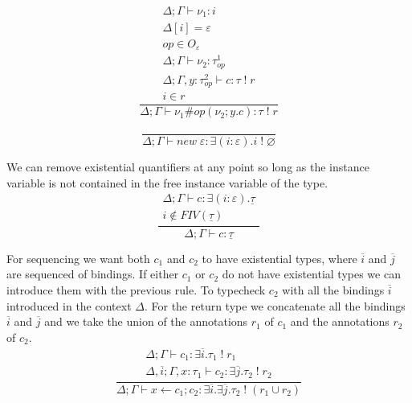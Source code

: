 \documentclass[12pt]{article}
\newcommand\eff[0]{\varepsilon}
\newcommand\Op[0]{O}
\newcommand\op[0]{op}
\newcommand\pty[1]{\ty^1_{#1}}
\newcommand\rty[1]{\ty^2_{#1}}
\newcommand\ty[0]{\tau}
\newcommand\cty[0]{\underline{\ty}}
\newcommand\aty[2]{#1 \; ! \; #2}
\newcommand\texists[3]{\exists(#1:#2) . #3}
\newcommand\texistss[2]{\exists \overline{#1} . #2}
\newcommand\val[0]{\nu}
\newcommand\comp[0]{c}
\newcommand\cdo[3]{#1 \leftarrow #2 ; #3}
\newcommand\copi[5]{#1 \# #2(#3 ; #4 . #5)}
\newcommand\cnew[1]{\textit{new} \; #1}
\begin{document}
\begin{minipage}{0.5\textwidth}
\[\frac{
	\begin{array}{l}
	\Delta;\Gamma \vdash \val_1 : i \\
	\Delta[i] = \eff \\
	\op \in \Op_\eff\\
	\Delta;\Gamma \vdash \val_2 : \pty{\op} \\
	\Delta;\Gamma , y : \rty{\op} \vdash \comp : \aty{\ty}{r} \\
	i \in r
	\end{array}
}{
	\Delta;\Gamma \vdash \copi{\val_1}{\op}{\val_2}{y}{\comp} : \aty{\ty}{r}
}\]
\vspace{10pt}
\end{minipage}
\begin{minipage}{0.5\textwidth}
\[\frac{
}{
	\Delta;\Gamma \vdash \cnew{\eff} : \texists{i}{\eff}{\aty{i}{\varnothing}}
}\]
\vspace{10pt}
\end{minipage}

We can remove existential quantifiers at any point so long as the instance variable is not contained in the free instance variable of the type. \\
\[\frac{
	\begin{array}{l}
	\Delta;\Gamma \vdash c : \texists{i}{\eff}{\cty} \\
	i \notin FIV(\cty)
	\end{array}
}{
	\Delta;\Gamma \vdash c : \cty
}\]

\newpage

For sequencing we want both $c_1$ and $c_2$ to have existential types, where $\overline{i}$ and $\overline{j}$ are sequenced of bindings. If either $c_1$ or $c_2$ do not have existential types we can introduce them with the previous rule.
To typecheck $c_2$ with all the bindings $\overline{i}$ introduced in the context $\Delta$. For the return type we concatenate all the bindings $\overline{i}$ and $\overline{j}$ and we take the union of the annotations $r_1$ of $c_1$ and the annotations $r_2$ of $c_2$. \\

\[\frac{
	\begin{array}{l}
	\Delta;\Gamma \vdash c_1 : \texistss{i}{\aty{\ty_1}{r_1}} \\
	\Delta,\overline{i} ; \Gamma, x : \ty_1 \vdash c_2 : \texistss{j}{\aty{\ty_2}{r_2}}
	\end{array}
}{
	\Delta;\Gamma \vdash \cdo{x}{c_1}{c_2} : \texistss{i}{\texistss{j}{\aty{\ty_2}{(r_1 \cup r_2)}}}
}\]
\end{document}
